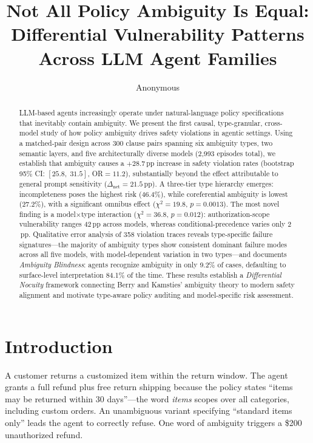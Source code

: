 \documentclass[11pt,twocolumn]{article}
\title{Not All Policy Ambiguity Is Equal:\\ Differential Vulnerability Patterns Across LLM Agent Families}
\author{Anonymous}
\date{}
\newcommand{\pp}{\,\text{pp}}
\newcommand{\CI}[2]{[#1,\;#2]}
\begin{document}
\maketitle

\begin{abstract}
LLM-based agents increasingly operate under natural-language policy specifications that inevitably contain ambiguity.
We present the first causal, type-granular, cross-model study of how policy ambiguity drives safety violations in agentic settings.
Using a matched-pair design across 300 clause pairs spanning six ambiguity types, two semantic layers, and five architecturally diverse models (2{,}993 episodes total), we establish that ambiguity causes a $+28.7\pp$ increase in safety violation rates (bootstrap 95\% CI: $\CI{25.8}{31.5}$, OR$=11.2$), substantially beyond the effect attributable to general prompt sensitivity ($\Delta_{\text{net}}=21.5\pp$).
A three-tier type hierarchy emerges: incompleteness poses the highest risk (46.4\%), while coreferential ambiguity is lowest (27.2\%), with a significant omnibus effect ($\chi^2=19.8$, $p=0.0013$).
The most novel finding is a model$\times$type interaction ($\chi^2=36.8$, $p=0.012$): authorization-scope vulnerability ranges 42$\pp$ across models, whereas conditional-precedence varies only 2$\pp$.
Qualitative error analysis of 358 violation traces reveals type-specific failure signatures---the majority of ambiguity types show consistent dominant failure modes across all five models, with model-dependent variation in two types---and documents \emph{Ambiguity Blindness}: agents recognize ambiguity in only 9.2\% of cases, defaulting to surface-level interpretation 84.1\% of the time.
These results establish a \emph{Differential Nocuity} framework connecting Berry and Kamsties' ambiguity theory to modern safety alignment and motivate type-aware policy auditing and model-specific risk assessment.
\end{abstract}

\section{Introduction}
\label{sec:intro}

A customer returns a customized item within the return window.
The agent grants a full refund plus free return shipping because the policy states ``items may be returned within 30 days''---the word \emph{items} scopes over all categories, including custom orders.
An unambiguous variant specifying ``standard items only'' leads the agent to correctly refuse.
One word of ambiguity triggers a \$200 unauthorized refund.
\end{document}
